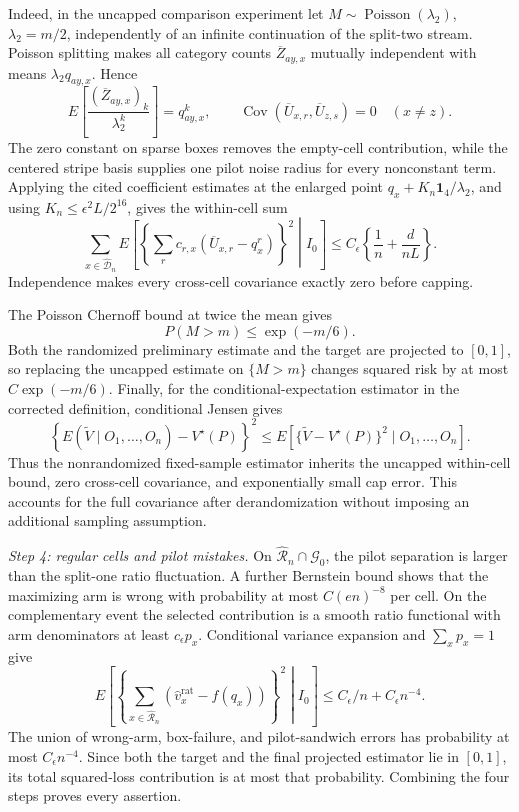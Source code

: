 Indeed, in the uncapped comparison experiment let \(M\sim\operatorname{Poisson}(\lambda_2)\), \(\lambda_2=m/2\), independently of an infinite continuation of the split-two stream.  Poisson splitting makes all category counts \(\overline Z_{ay,x}\) mutually independent with means \(\lambda_2q_{ay,x}\).  Hence
\[
 E\left[\frac{(\overline Z_{ay,x})_k}{\lambda_2^k}\right]
 =q_{ay,x}^k,
 \qquad
 \operatorname{Cov}\left(
  \overline U_{x,r},\overline U_{z,s}\right)=0
 \quad(x\ne z).
\]
The zero constant on sparse boxes removes the empty-cell contribution, while the centered stripe basis supplies one pilot noise radius for every nonconstant term.  Applying the cited coefficient estimates at the enlarged point \(q_x+K_n\mathbf1_4/\lambda_2\), and using \(K_n\le\epsilon^2L/2^{16}\), gives the within-cell sum
\[
 \sum_{x\in\widehat{\mathcal D}_n} E\left[
  \left\{
   \sum_r c_{r,x}(\overline U_{x,r}-q_x^r)
  \right\}^2\middle|I_0\right]
 \le C_\epsilon\left\{\frac1n+\frac d{nL}\right\}.
\]
Independence makes every cross-cell covariance exactly zero before capping.

The Poisson Chernoff bound at twice the mean gives
\[
 P(M>m)\le\exp(-m/6).
\]
Both the randomized preliminary estimate and the target are projected to \([0,1]\), so replacing the uncapped estimate on \(\{M>m\}\) changes squared risk by at most \(C\exp(-m/6)\).  Finally, for the conditional-expectation estimator in the corrected definition, conditional Jensen gives
\[
 \left\{E(\widetilde V\mid O_1,\ldots,O_n)-V^\star(P)\right\}^2
 \le E\left[\{\widetilde V-V^\star(P)\}^2\mid O_1,\ldots,O_n\right].
\]
Thus the nonrandomized fixed-sample estimator inherits the uncapped within-cell bound, zero cross-cell covariance, and exponentially small cap error.  This accounts for the full covariance after derandomization without imposing an additional sampling assumption.

\emph{Step 4: regular cells and pilot mistakes.}
On \(\widehat{\mathcal R}_n\cap\mathcal G_0\), the pilot separation is larger than the split-one ratio fluctuation.  A further Bernstein bound shows that the maximizing arm is wrong with probability at most \(C(en)^{-8}\) per cell.  On the complementary event the selected contribution is a smooth ratio functional with arm denominators at least \(c_\epsilon p_x\).  Conditional variance expansion and \(\sum_xp_x=1\) give
\[
 E\left[
  \left\{\sum_{x\in\widehat{\mathcal R}_n}
   (\widehat v_x^{\mathrm{rat}}-f(q_x))\right\}^2
  \middle| I_0\right]
 \le C_\epsilon/n+C_\epsilon n^{-4}.
\]
The union of wrong-arm, box-failure, and pilot-sandwich errors has probability at most \(C_\epsilon n^{-4}\).  Since both the target and the final projected estimator lie in \([0,1]\), its total squared-loss contribution is at most that probability.  Combining the four steps proves every assertion.